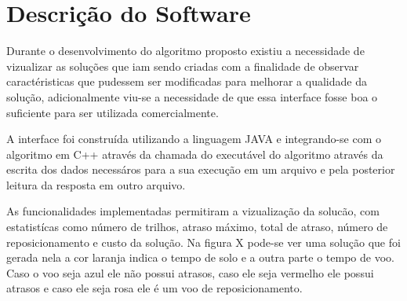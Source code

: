   \chapter{Descrição do Software}\label{cap:modelomat}
  
  Durante o desenvolvimento do algoritmo proposto existiu a necessidade de
  vizualizar as soluções que iam sendo criadas com a finalidade de observar
  caractéristicas que pudessem ser modificadas para melhorar a qualidade da
  solução, adicionalmente viu-se a necessidade de que essa interface fosse boa o
  suficiente para ser utilizada comercialmente.
  
  A interface foi construída utilizando a linguagem JAVA e integrando-se com o
  algoritmo em C++ através da chamada do executável do algoritmo através da
  escrita dos dados necessáros para a sua execução em um arquivo e pela
  posterior leitura da resposta em outro arquivo.
  
  As funcionalidades implementadas permitiram a vizualização da solucão, com
  estatistícas como número de trilhos, atraso máximo, total de atraso, número de
  reposicionamento e custo da solução. Na figura X pode-se ver uma solução que
  foi gerada nela a cor laranja indica o tempo de solo e a outra parte o tempo
  de voo. Caso o voo seja azul ele não possui atrasos, caso ele seja vermelho
  ele possui atrasos e caso ele seja rosa ele é um voo de reposicionamento.
  
  
